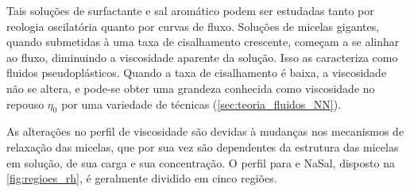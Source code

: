 		Tais soluções de surfactante e sal aromático podem ser estudadas tanto por reologia oscilatória quanto por curvas de fluxo. Soluções de micelas gigantes, quando submetidas à uma taxa de cisalhamento crescente, começam a se alinhar ao fluxo, diminuindo a viscosidade aparente da solução. Isso as caracteriza como fluidos pseudoplásticos. Quando a taxa de cisalhamento é baixa, a viscosidade não se altera, e pode-se obter uma grandeza conhecida como viscosidade no repouso \(\eta_0\) por uma variedade de técnicas (\autoref{sec:teoria_fluidos_NN}). 
		
		As alterações no perfil de viscosidade são devidas à mudanças nos mecanismos de relaxação das micelas, que por sua vez são dependentes da estrutura das micelas em solução, de sua carga e sua concentração. O perfil para \CTAB{} e NaSal, disposto na \autoref{fig:regioes_rh}, é geralmente dividido em cinco regiões.\cite{Rehage1988}
		
